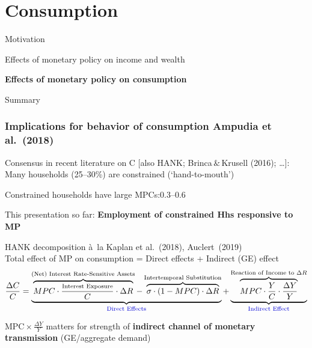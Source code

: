\documentclass[pdflatex,aspectratio=169]{beamer}
\newcommand{\jemph}[1]{{\color{StataDarkBlue}#1}}
\newcommand{\jbemph}[1]{\textbf{\color{SlideNavy}#1}}
\begin{document}
\section{Consumption}
\begin{frame}
\bi\setlength{\itemsep}{3mm}
\item Motivation
\item Effects of monetary policy on income and wealth
\item \jbemph{Effects of monetary policy on consumption}
\item Summary
\ei
\end{frame}



\begin{frame}\frametitle{\bf Implications for behavior of consumption \hspace*{\fill} \footnotesize{Ampudia et al.\ (2018)} }


\bi\setlength{\itemsep}{2mm}
\item {Consensus in recent literature on C $[$also HANK; Brinca$\,\&\,$Krusell (2016); \dots$]$:}\\
Many households (25--30\%) are \jemph{constrained} (`hand-to-mouth') 
\pause
\item Constrained households have \jemph{large MPCs:$0.3$--$0.6$}
\pause
\item This presentation so far: \jbemph{Employment of constrained Hhs responsive to MP}
\pause
\item  HANK decomposition \`a\ la Kaplan et al.~(2018), Auclert~(2019)\\[1mm]
Total effect of MP on consumption = Direct effects + Indirect (GE) effect
{\small
$$
\frac{\Delta C}{C}=\underbrace{\overbrace{MPC\cdot\frac{\text{\scriptsize{Interest Exposure}}}{C}\cdot\Delta R}^{\text{(Net) Interest Rate-Sensitive Assets}}-\overbrace{\sigma\cdot(1-MPC)\cdot\Delta R}^{\text{Intertemporal Substitution}}}_{\text{\jemph{Direct Effects}}}+\underbrace{\overbrace{MPC\cdot\frac{Y}{C}\cdot\frac{\Delta Y}{Y}}^{\text{Reaction of Income to $\Delta R$}}}_{\text{\jemph{Indirect Effect}}}
$$
}
\pause
 \item \jemph{MPC${}\times\frac{\Delta Y}{Y}$ matters for strength of \jbemph{indirect channel of monetary transmission} (GE/aggregate demand) }\\
\ei


\end{frame}
\end{document}
